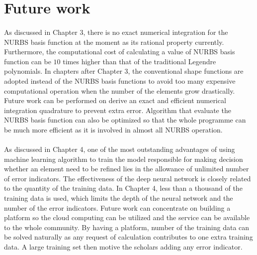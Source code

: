 \section{Future work}
\paragraph{}
As discussed in Chapter 3, there is no exact numerical integration for the NURBS basis function at the moment as its rational property currently.
Furthermore, the computational cost of calculating a value of NURBS basis function can be $10$ times higher than that of the traditional Legendre polynomials.
In chapters after Chapter 3, the conventional shape functions are adopted instead of the NURBS basis functions to avoid too many expensive computational operation when the number of the elements grow drastically.
Future work can be performed on derive an exact and efficient numerical integration quadrature to prevent extra error.
Algorithm that evaluate the NURBS basis function can also be optimized so that the whole programme can be much more efficient as it is involved in almost all NURBS operation.

\paragraph{}
As discussed in Chapter 4, one of the most outstanding advantages of using machine learning algorithm to train the model responsible for making decision whether an element need to be refined lies in the allowance of unlimited number of error indicators.
The effectiveness of the deep neural network is closely related to the quantity of the training data.
In Chapter 4, less than a thousand of the training data is used, which limits the depth of the neural network and the number of the error indicators.
Future work can concentrate on building a platform so the cloud computing can be utilized and the service can be available to the whole community.
By having a platform, number of the training data can be solved naturally as any request of calculation contributes to one extra training data.
A large training set then motive the scholars adding any error indicator.
